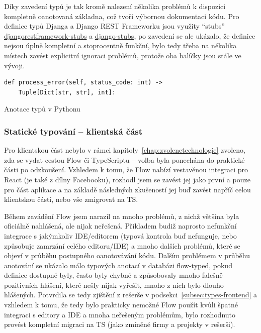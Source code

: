 Díky zavedení typů je tak kromě nalezení několika problémů k dispozici kompletně oanotovaná základna, což tvoří výbornou dokumentaci kódu. Pro definice typů Djanga a Django REST Frameworku jsou využity \enquote{stubs} \href{https://github.com/typeddjango/djangorestframework-stubs}{djangorestframework-stubs} a \href{https://github.com/typeddjango/django-stubs/}{django-stubs}, po zavedení se ale ukázalo, že definice nejsou úplně kompletní a stoprocentně funkční, bylo tedy třeba na několika místech zavést explicitní ignoraci problémů, protože oba balíčky jsou stále ve vývoji.

\begin{listing}[ht]
	\begin{verbatim}
def process_error(self, status_code: int) -> 
    Tuple[Dict[str, str], int]:
	\end{verbatim}
	\caption{Anotace typů v Pythonu}\label{lst:statictyping-python}
\end{listing}
\subsubsection{Statické typování -- klientská část}

Pro klientskou část nebylo v rámci kapitoly~\ref{chap:zvolenetechnologie} zvoleno, zda se vydat cestou Flow či TypeScriptu -- volba byla ponechána do praktické části po odzkoušení. Vzhledem k tomu, že Flow nabízí vestavěnou integraci pro React (je také z dílny Facebooku), rozhodl jsem se zavést jej jako první a pouze pro část aplikace a na základě následných zkušeností jej buď zavést napříč celou klientskou částí, nebo vše zmigrovat na TS.

Během zavádění Flow jsem narazil na mnoho problémů, z nichž většina byla oficiálně nahlášená, ale nijak neřešená. Příkladem budiž naprosto nefunkční integrace s jakýmkoliv IDE/editorem (typová kontrola buď nefunguje, nebo způsobuje zamrzání celého editoru/IDE) a mnoho dalších problémů, které se objeví v průběhu postupného oanotovávání kódu. Dalším problémem v průběhu anotování se ukázalo málo typových anotací v databázi flow-typed, pokud definice dostupné byly, často byly chybné a způsobovaly mnoho falešně pozitivních hlášení, které nešly nijak vyřešit, mnoho z nich bylo dlouho hlášených. Potvrdila se tedy zjištění z rešerše v podsekci~\ref{subsec:types-frontend} a vzhledem k tomu, že tedy bylo prakticky nemožné Flow použít kvůli špatné integraci s editory a IDE a mnoha neřešeným problémům, bylo rozhodnuto provést kompletní migraci na TS (jako zmíněné firmy a projekty v rešerši).

